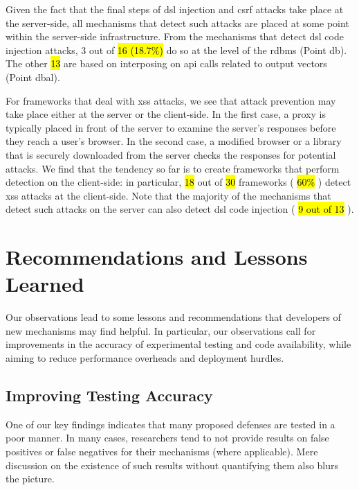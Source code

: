 \documentclass[10pt,journal,compsoc]{IEEEtran}
\newcommand{\hlc}[2][yellow]{ {\sethlcolor{#1} \hl{#2}} }
\begin{document}
Given the fact that the final steps of
{\sc dsl} injection and {\sc csrf} attacks take place
at the server-side, all mechanisms that detect
such attacks are placed at some point within the server-side infrastructure.
From the mechanisms that detect {\sc dsl} code injection
attacks, 3 out of \hlc[yellow]{16 (18.7\%)} do so at the level
of the {\sc rdbms} (Point {\sc db}).
The other \hlc[yellow]{13} are based on interposing on {\sc api} calls related to output
vectors (Point {\sc dbal}).

For frameworks that deal with {\sc xss} attacks, we
see that attack prevention may take place either at the server or
the client-side. In the first case, a proxy is typically placed in front of the server
to examine the server's responses before they reach a user's 
browser. In the second case, a modified browser or a library that is
securely downloaded from the server checks the responses for potential
attacks. We find that the tendency so far is to create frameworks that
perform detection on the client-side: in particular,
\hlc[yellow]{18} out of \hlc[yellow]{30}
frameworks (\hlc[yellow]{60\%}) detect {\sc xss} attacks at the
client-side. Note that the majority of the mechanisms that detect
such attacks on the server can also detect {\sc dsl} code
injection (\hlc[yellow]{9 out of 13}).

\vspace{-0.3mm}
\section{Recommendations and Lessons Learned}
\label{sec:lessons-learned}
\vspace{-0.3mm}

Our observations lead to some lessons and recommendations that
developers of new mechanisms may find helpful. In particular,
our observations
call for improvements in the accuracy of experimental testing
and code availability, while
aiming to reduce performance overheads and deployment hurdles.

\vspace{-0.3mm}
\subsection{Improving Testing Accuracy}
\vspace{-0.3mm}

One of our key findings indicates that many proposed defenses are
tested in a poor manner. In many cases, researchers tend to not provide
results on false positives or false negatives for their mechanisms
(where applicable).
Mere discussion on the existence of such results without quantifying
them also blurs the picture.
\end{document}
